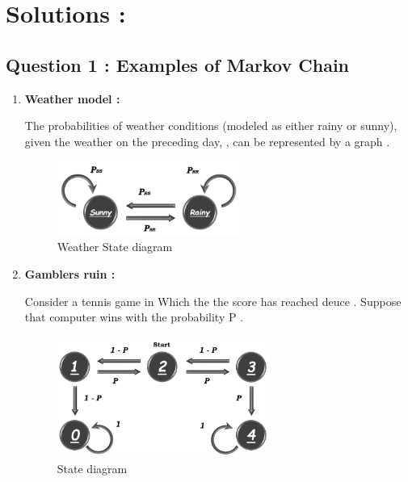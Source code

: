 \documentclass[a4paper]{article}
\begin{document}
	\section{\LARGE Solutions : }
		\subsection{{\Large Question 1 :} Examples of Markov Chain }
			\begin{enumerate}
				\item{\textbf{Weather model :} 
					
					 The probabilities of weather conditions (modeled as either rainy or sunny), given the weather on the preceding day, , can be represented by a graph .
					 \begin{figure}[htbp]
				 	 \begin{center}
				 	 	\includegraphics[width= 6cm]{img/weather_Diagram} 
			 	 	 \end{center}
		 	 	 \caption{Weather State diagram}
		 	 	 \end{figure}
		 	 	 }
				 		
				\item{\textbf{Gamblers ruin :}

					Consider a tennis game in Which the the score has reached deuce .
					Suppose that computer wins with the probability P .
					\begin{figure}[htbp]
						\begin{center}
							\includegraphics[width= 7cm]{img/tennis_Diagram} 
						\end{center}
						\caption{State diagram}
				\end{figure}
			}
				

\end{enumerate}
\end{document}
